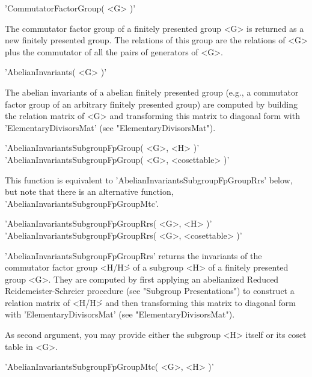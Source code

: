 \vspace{5mm}
'CommutatorFactorGroup( <G> )'%

The commutator factor group of a finitely presented group <G> is returned
as a  new finitely presented group.  The relations of this group are  the
relations  of <G> plus  the  commutator of all the pairs of generators of
<G>.

\vspace{5mm}
'AbelianInvariants( <G> )'%

The abelian invariants  of  a  abelian finitely presented group  (e.g., a
commutator  factor group of an arbitrary  finitely presented  group)  are
computed by  building the relation matrix of  <G> and  transforming  this
matrix    to    diagonal   form    with   'ElementaryDivisorsMat'    (see
"ElementaryDivisorsMat").

\vspace{5mm}
'AbelianInvariantsSubgroupFpGroup( <G>, <H> )'%
 \\
'AbelianInvariantsSubgroupFpGroup( <G>, <cosettable> )'

This  function  is  equivalent  to  'AbelianInvariantsSubgroupFpGroupRrs'
below,    but   note  that      there is     an    alternative  function,
'AbelianInvariantsSubgroupFpGroupMtc'.

\vspace{5mm}
'AbelianInvariantsSubgroupFpGroupRrs( <G>, <H> )'%
 \\
'AbelianInvariantsSubgroupFpGroupRrs( <G>, <cosettable> )'

'AbelianInvariantsSubgroupFpGroupRrs'  returns   the  invariants  of  the
commutator factor group <H/H\'> of a subgroup <H> of a finitely presented
group <G>.   They are computed by  first  applying an abelianized Reduced
Reidemeister-Schreier    procedure  (see   "Subgroup   Presentations") to
construct a relation matrix of <H/H\'> and  then transforming this matrix
to     diagonal        form    with       'ElementaryDivisorsMat'    (see
"ElementaryDivisorsMat").

As second argument, you may provide either the subgroup <H> itself or its
coset table in <G>.

\vspace{5mm}
'AbelianInvariantsSubgroupFpGroupMtc( <G>, <H> )'%

